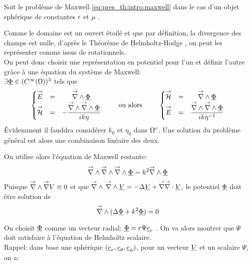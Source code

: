 Soit le problème de Maxwell \eqref{eq:pres_th:intro:maxwell} dans le cas d'un objet sphérique de constantes $\epsilon$ et $\mu$%
.

Comme le domaine est un ouvert étoilé et que par définition, la divergence des champs est nulle, d'après le Théorème de Helmholtz-Hodge \cite{gui_rigorous_2007}, on peut les représenter comme issus de rotationnels.\\
On peut donc choisir une représentation en potentiel pour l'un et définir l'autre grâce à une équation du système de Maxwell:\\
 $\exists \underline{\Phi} \in (C^\infty(\Omega))^3$ tels que
\begin{equation}
  \label{eq:sol_maxwell:pot_hertz}
  \left\lbrace\begin{matrix}
    {\overset{\rightarrow}{E}} &=& {\overset{\rightarrow}{\nabla}}\wedge \underline{\Phi} \\
    {\overset{\rightarrow}{\mathcal{H}}} &=& - \dfrac{{\overset{\rightarrow}{\nabla}}\wedge {\overset{\rightarrow}{\nabla}}\wedge \underline{\Phi}}{ik\eta}
  \end{matrix} \right.
  \qquad \text{ ou alors } \qquad
  \left\lbrace\begin{matrix}
    {\overset{\rightarrow}{\mathcal{H}}} &=& {\overset{\rightarrow}{\nabla}}\wedge \underline{\Phi}\\
    {\overset{\rightarrow}{E}} &=& \dfrac{{\overset{\rightarrow}{\nabla}}\wedge {\overset{\rightarrow}{\nabla}}\wedge \underline{\Phi}}{ik\eta^{-1}}\\
  \end{matrix}\right.
\end{equation}
Évidemment il fauddra considérer $k_0$ et $\eta_0$ dans $\Omega^c$. Une solution du problème général est alors une combinaison linéaire des deux.

On utilise alors l'équation de Maxwell restante:
\[
    {\overset{\rightarrow}{\nabla}}\wedge {\overset{\rightarrow}{\nabla}}\wedge {\overset{\rightarrow}{\nabla}}\wedge \underline{\Phi} = k^2 {\overset{\rightarrow}{\nabla}}\wedge \underline{\Phi}
\]
Puisque ${\overset{\rightarrow}{\nabla}}\wedge  {\overset{\rightarrow}{\nabla}}  V  \equiv 0$ et que ${\overset{\rightarrow}{\nabla}}\wedge\, {\overset{\rightarrow}{\nabla}}\wedge \underline{V} = -\Delta \underline{V} + {\overset{\rightarrow}{\nabla}} {\overset{\rightarrow}{\nabla}}\cdot \underline{V}$, le potentiel $\underline{\Phi}$ doit être solution de 
\begin{equation}
  \label{eq:sol_maxwell:helmholtz_vect}
  {\overset{\rightarrow}{\nabla}}\wedge ( \Delta \underline{\Phi} + k^2 \underline{\Phi} ) = 0
\end{equation}

On choisit $\underline{\Phi}$ comme un vecteur radial: $\underline{\Phi} = r \Psi \underline{e}_r$ \cite[p.~84]{bohren_absorption_2004}. On va alors montrer que $\Psi$ doit satisfaire à l'équation de Helmholtz scalaire.\\

Rappel: dans base une sphérique $(\underline{e}_r, \underline{e}_\theta, \underline{e}_\phi)$, pour 
un vecteur $\underline{V}$ 
et un scalaire $\Psi$, on a:

